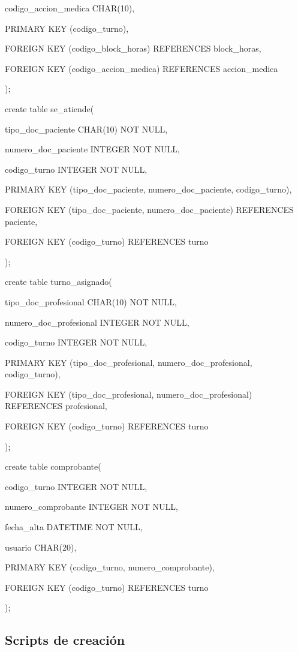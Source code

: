 \documentclass[a4paper,11pt]{article}
\begin{document}
codigo\_accion\_medica  CHAR(10),    

PRIMARY KEY (codigo\_turno),

FOREIGN KEY (codigo\_block\_horas) REFERENCES block\_horas,

FOREIGN KEY (codigo\_accion\_medica) REFERENCES accion\_medica

); 

create table se\_atiende(

tipo\_doc\_paciente  CHAR(10) NOT NULL,

numero\_doc\_paciente  INTEGER NOT NULL,

codigo\_turno   INTEGER NOT NULL,

PRIMARY KEY (tipo\_doc\_paciente, numero\_doc\_paciente, codigo\_turno),

FOREIGN KEY (tipo\_doc\_paciente, numero\_doc\_paciente) REFERENCES paciente,

FOREIGN KEY (codigo\_turno) REFERENCES turno

);

create table turno\_asignado(

tipo\_doc\_profesional  CHAR(10) NOT NULL,

numero\_doc\_profesional   INTEGER NOT NULL,

codigo\_turno   INTEGER NOT NULL,

PRIMARY KEY (tipo\_doc\_profesional, numero\_doc\_profesional, codigo\_turno),

FOREIGN KEY (tipo\_doc\_profesional, numero\_doc\_profesional) REFERENCES profesional,

FOREIGN KEY (codigo\_turno) REFERENCES turno

);

create table comprobante(

codigo\_turno   INTEGER NOT NULL,

numero\_comprobante  INTEGER NOT NULL, 

fecha\_alta   DATETIME NOT NULL,

usuario    CHAR(20),

PRIMARY KEY (codigo\_turno, numero\_comprobante),

FOREIGN KEY (codigo\_turno) REFERENCES turno

);

\newpage

\subsection{Scripts de creación}
\end{document}
